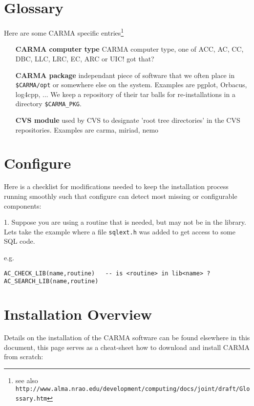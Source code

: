 \documentclass{article}
\begin{document}
\section*{Glossary}

Here are some CARMA specific 
entries\footnote{see also
{\tt http://www.alma.nrao.edu/development/computing/docs/joint/draft/Glossary.htm}}
\begin{itemize}

\item[{\bf CARMA computer type}]
CARMA computer type, one of ACC, AC, CC, DBC, LLC, LRC, EC, ARC or UIC! got that?

\item[{\bf CARMA package}]
independant piece of software that we often
place in {\tt \$CARMA/opt} or somewhere else on the system.
Examples are pgplot, Orbacus, log4cpp, ...  We keep a repository
of their tar balls for re-installations in a directory
{\tt \$CARMA\_PKG}.

\item[{\bf CVS module}]
used by CVS to designate 'root tree directories' in the
CVS repositories. Examples are carma, miriad, nemo

\end{itemize}

\newpage

\section*{Configure}

Here is a checklist for modifications needed to keep the installation process
running smoothly such that configure can detect most missing or configurable
components:


1. Suppose you are using a routine that is needed, but may not be in the
library. Lets take the example where a file {\tt sqlext.h} was added to
get access to some SQL code.

e.g.
\begin{verbatim}
AC_CHECK_LIB(name,routine)   -- is <routine> in lib<name> ?
AC_SEARCH_LIB(name,routine)  
\end{verbatim}

\newpage

\section*{Installation Overview}

Details on the installation of the CARMA software can be
found elsewhere in this document, this page serves 
as a cheat-sheet how to download and install CARMA from scratch:
\end{document}
